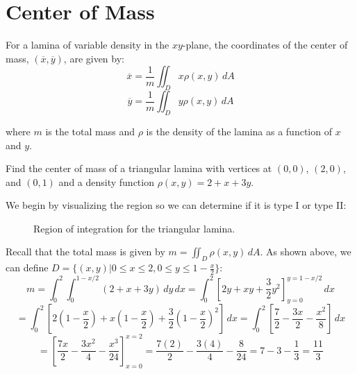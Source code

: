 \section{Center of Mass}
For a lamina of variable density in the $xy$-plane, the coordinates
of the center of mass, $(\overline{x}, \overline{y})$, are given by:
$$\overline{x} = \frac{1}{m} \iint_{\textit{D}} x \rho (x, y)\,dA$$
$$\overline{y} = \frac{1}{m} \iint_{\textit{D}} y \rho (x, y)\,dA$$

where $m$ is the total mass and $\rho$ is the density of the lamina as a 
function of $x$ and $y$. 

\begin{Worked}
\begin{Problem}
Find the center of mass of a triangular lamina with vertices
at $(0, 0)$, $(2, 0)$, and $(0, 1)$ and a density function $\rho (x, y) = 2 + 
x + 3y$. 
\end{Problem}
\begin{Solution}
We begin by visualizing the region so we can determine if
it is type I or type II:

\begin{figure}[H]
\centering
{}
\caption{Region of integration for the triangular lamina.}
\label{fig:triangle_region}
\end{figure}
Recall that the total mass is given by $m = \iint_{\textit{D}} \rho (x, y)
\,dA$. As shown above, we can define $\textit{D} = \{ \left( x, y \right) | 0 
\leq x \leq 2, 0 \leq y \leq 1 - \frac{x}{2} \}$:
$$m = \int_{0}^{2} \int_{0}^{1 - x/2} \left( 2 + x + 3y \right) \,dy \,dx = 
\int_{0}^2 \left[2y + xy + \frac{3}{2}y^2 \right]_{y = 0}^{y = 1 - x/2}\,dx$$
$$= \int_0^2 \left[ 2(1 - \frac{x}{2}) + x(1 - \frac{x}{2}) + \frac{3}{2} (1 - 
\frac{x}{2})^2 \right]\,dx = \int_0^2 \left[ \frac{7}{2} - \frac{3x}{2} - 
\frac{x^2}{8} \right]\,dx$$
$$= \left[ \frac{7x}{2} - \frac{3x^2}{4} - \frac{x^3}{24} \right]_{x = 0}^{x = 
2} = \frac{7(2)}{2} - \frac{3(4)}{4} - \frac{8}{24} = 7 - 3 - \frac{1}{3} = 
\frac{11}{3}$$


\end{Solution}
\end{Worked}

